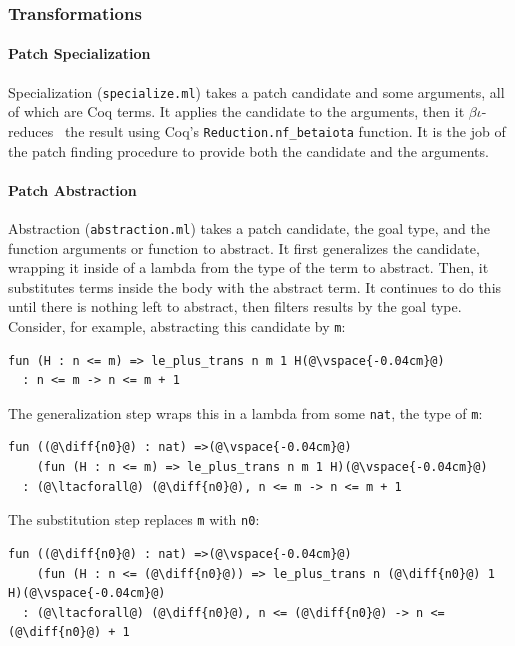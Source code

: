 \subsubsection{Transformations}

\paragraph{Patch Specialization} Specialization (\lstinline{specialize.ml}) takes a patch candidate and some arguments,
all of which are Coq terms.
It applies the candidate to the arguments, then it $\beta\iota$-reduces~\cite{equality} the result using Coq's
\lstinline{Reduction.nf_betaiota} function. It is the job of the 
patch finding procedure to provide both the candidate and the arguments.

\paragraph{Patch Abstraction} Abstraction (\lstinline{abstraction.ml}) takes a patch candidate, 
the goal type, and the function arguments or function to abstract.
It first generalizes the candidate, wrapping it inside of a lambda from the type of the term to abstract.
Then, it substitutes terms inside the body with the abstract term.
It continues to do this until there is nothing left to abstract, then filters results by the goal type.
Consider, for example, abstracting this candidate by \lstinline{m}:

\begin{lstlisting}[language=coq]
  fun (H : n <= m) => le_plus_trans n m 1 H(@\vspace{-0.04cm}@)
  : n <= m -> n <= m + 1
\end{lstlisting}
The generalization step wraps this in a lambda from some \lstinline{nat}, the type of \lstinline{m}:

\begin{lstlisting}[language=coq]
  fun ((@\diff{n0}@) : nat) =>(@\vspace{-0.04cm}@)
    (fun (H : n <= m) => le_plus_trans n m 1 H)(@\vspace{-0.04cm}@)
  : (@\ltacforall@) (@\diff{n0}@), n <= m -> n <= m + 1
\end{lstlisting}
The substitution step replaces \lstinline{m} with \lstinline{n0}:

\begin{lstlisting}[language=coq]
  fun ((@\diff{n0}@) : nat) =>(@\vspace{-0.04cm}@)
    (fun (H : n <= (@\diff{n0}@)) => le_plus_trans n (@\diff{n0}@) 1 H)(@\vspace{-0.04cm}@)
  : (@\ltacforall@) (@\diff{n0}@), n <= (@\diff{n0}@) -> n <= (@\diff{n0}@) + 1
\end{lstlisting}

